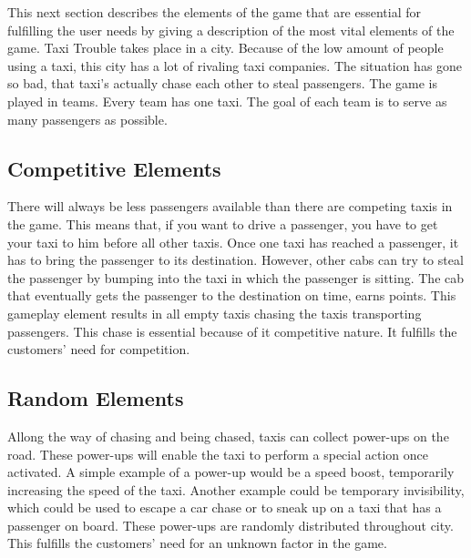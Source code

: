 
This next section describes the elements of the game that are essential for fulfilling the user needs by giving a description of the most vital elements of the game. Taxi Trouble takes place in a city. Because of the low amount of people using a taxi, this city has a lot of rivaling taxi companies. The situation has gone so bad, that taxi's actually chase each other to steal passengers. The game is played in teams. Every team has one taxi. The goal of each team is to serve as many passengers as possible.


\subsection{Competitive Elements}
There will always be less passengers available than there are competing taxis in the game. This means that, if you want to drive a passenger, you have to get your taxi to him before all other taxis. Once one taxi has reached a passenger, it has to bring the passenger to its destination. However, other cabs can try to steal the passenger by bumping into the taxi in which the passenger is sitting. The cab that eventually gets the passenger to the destination on time, earns points. This gameplay element results in all empty taxis chasing the taxis transporting passengers. This chase is essential because of it competitive nature. It fulfills the customers' need for competition. 

\subsection{Random Elements}

Allong the way of chasing and being chased, taxis can collect power-ups on the road. These power-ups will enable the taxi to perform a special action once activated. A simple example of a power-up would be a speed boost, temporarily increasing the speed of the taxi. Another example could be temporary invisibility, which could be used to escape a car chase or to sneak up on a taxi that has a passenger on board. These power-ups are randomly distributed throughout city. This fulfills the customers' need for an unknown factor in the game. 

